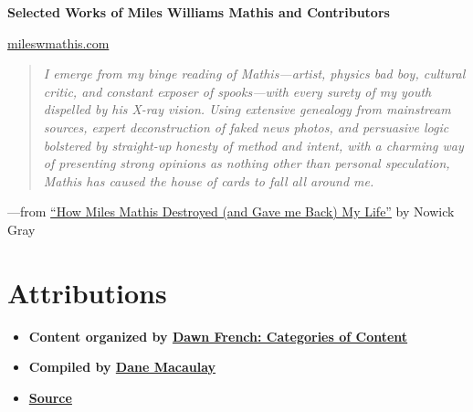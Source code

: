 \documentclass{article}
\begin{document}
\begin{titlepage}
    \centering
    \vfill
    {\Huge \bfseries Selected Works of Miles Williams Mathis and Contributors\par}
    \vfill
    {\Large \href{http://mileswmathis.com}{mileswmathis.com}}
    \vfill
\end{titlepage}

\newpage
\thispagestyle{empty}
\vspace*{\fill}

\begin{quote}
\centering
\textit{I emerge from my binge reading of Mathis—artist, physics bad boy, cultural critic, and constant exposer of spooks—with every surety of my youth dispelled by his X-ray vision. Using extensive genealogy from mainstream sources, expert deconstruction of faked news photos, and persuasive logic bolstered by straight-up honesty of method and intent, with a charming way of presenting strong opinions as nothing other than personal speculation, Mathis has caused the house of cards to fall all around me.}
\end{quote}

\centering —from \href{https://nowickgray.com/last-curtain-miles-mathis/}{“How Miles Mathis Destroyed (and Gave me Back) My Life”}
\centering by Nowick Gray

\vspace*{\fill}





\newpage
\section*{Attributions}

\begin{itemize}
  \item \textbf{Content organized by \href{https://theresearchofmilesmathis.substack.com/p/categories-of-content}{Dawn French: Categories of Content}}
  \item \textbf{Compiled by \href{mailto:dane.macaulay@gmail.com}{Dane Macaulay}}
  \item \textbf{\href{https://github.com/danemacaulay/ebook/}{Source}}
\end{itemize}
\end{document}
